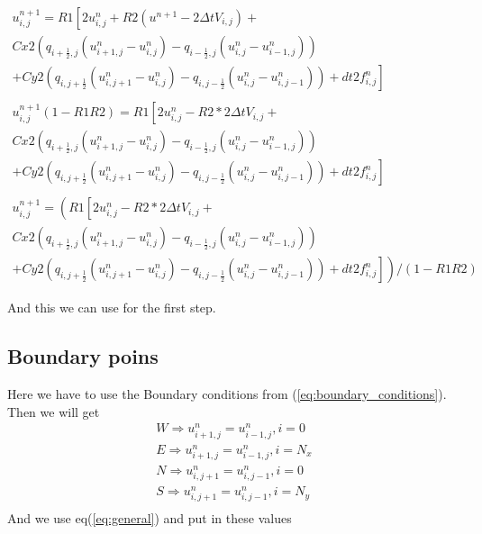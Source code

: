 \documentclass[norsk,11pt,a4paper]{article}
\begin{document}
\begin{equation}\label{eq:first_step}
\begin{aligned}
u^{n+1}_{i,j} = R1\left[ 2u^n_{i,j}+R2(u^{n+1}-2\Delta t V_{i,j})+ \right.\\
\left.Cx2\left(q_{i+\frac{1}{2},j}(u^n_{i+1,j}-u^n_{i,j})-q_{i-\frac{1}{2},j}(u^n_{i,j}-u^n_{i-1,j})\right)\right. \\
+ \left.Cy2\left(q_{i,j+\frac{1}{2}}(u^n_{i,j+1}-u^n_{i,j})-q_{i,j-\frac{1}{2}}(u^n_{i,j}-u^n_{i,j-1})\right) + dt2 f^n_{i,j}\right]\\
\\
u^{n+1}_{i,j}(1-R1R2) = R1\left[ 2u^n_{i,j}-R2*2\Delta t V_{i,j}+ \right.\\
\left.Cx2\left(q_{i+\frac{1}{2},j}(u^n_{i+1,j}-u^n_{i,j})-q_{i-\frac{1}{2},j}(u^n_{i,j}-u^n_{i-1,j})\right)\right. \\
+ \left.Cy2\left(q_{i,j+\frac{1}{2}}(u^n_{i,j+1}-u^n_{i,j})-q_{i,j-\frac{1}{2}}(u^n_{i,j}-u^n_{i,j-1})\right) + dt2 f^n_{i,j}\right]\\
\\
u^{n+1}_{i,j}= \left(R1\left[ 2u^n_{i,j}-R2*2\Delta t V_{i,j}+ \right.\right.\\
\left.\left.Cx2\left(q_{i+\frac{1}{2},j}(u^n_{i+1,j}-u^n_{i,j})-q_{i-\frac{1}{2},j}(u^n_{i,j}-u^n_{i-1,j})\right)\right.\right. \\
+ \left.\left.Cy2\left(q_{i,j+\frac{1}{2}}(u^n_{i,j+1}-u^n_{i,j})-q_{i,j-\frac{1}{2}}(u^n_{i,j}-u^n_{i,j-1})\right) + dt2 f^n_{i,j}\right]\right)/(1-R1R2)
\end{aligned}
\end{equation}

And this we can use for the first step.

\subsection*{Boundary poins}
Here we have to use the Boundary conditions from (\ref{eq:boundary_conditions}). Then we will get
\begin{equation}
\begin{aligned}
W \Rightarrow u^{n}_{i+1,j} = u^{n}_{i-1,j},i=0\\
E \Rightarrow u^{n}_{i+1,j} = u^{n}_{i-1,j},i=N_x\\
N \Rightarrow u^{n}_{i,j+1} = u^{n}_{i,j-1},i=0\\
S \Rightarrow u^{n}_{i,j+1} = u^{n}_{i,j-1},i=N_y\\
\end{aligned}
\end{equation}
 And we use eq(\ref{eq:general}) and put in these values
\end{document}
